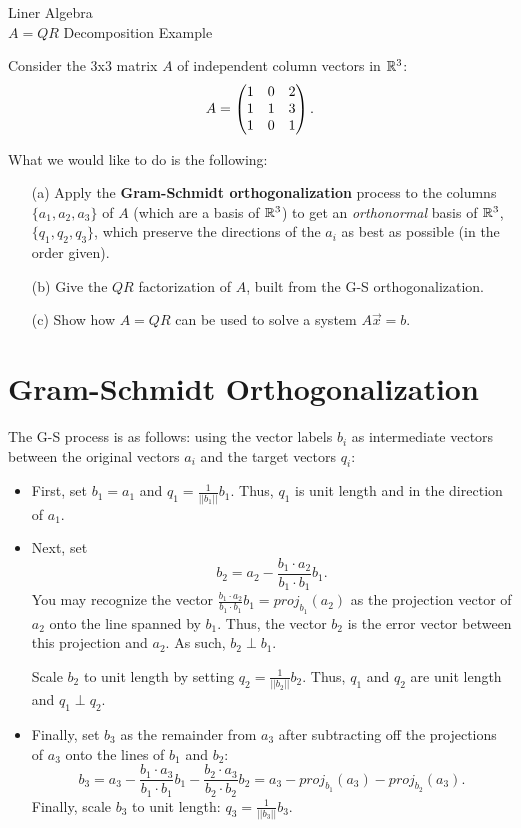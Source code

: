 \documentclass[10pt]{article}
\begin{document}


\begin{center}
Liner Algebra\\
$A = QR$ Decomposition Example
\end{center}


Consider the 3x3 matrix $A$ of independent column vectors in $\mathbb{R}^3$: 
\[ A = \begin{pmatrix} 1 & 0 & 2 \\ 1 & 1 & 3 \\ 1 & 0 & 1 \end{pmatrix}. \]

What we would like to do is the following: 
\begin{itemize}
\item[(a) ] Apply the \textbf{Gram-Schmidt orthogonalization} process to the columns $\{a_1, a_2, a_3\}$ of $A$ (which are a basis of $\mathbb{R}^3$) to get an \emph{orthonormal} basis of $\mathbb{R}^3$, $\{q_1, q_2, q_3\}$, which preserve the directions of the $a_i$ as best as possible (in the order given). 
\item[(b) ] Give the $QR$ factorization of $A$, built from the G-S orthogonalization.
\item[(c) ] Show how $A = QR$ can be used to solve a system $A \vec{x} = b$. 
\end{itemize}

\section{Gram-Schmidt Orthogonalization}

The G-S process is as follows: using the vector labels $b_i$ as intermediate vectors between the original vectors $a_i$ and the target vectors $q_i$: 
\begin{itemize}
\item First, set $b_1 = a_1$ and $q_1 = \frac{1}{||b_1||} b_1$. Thus, $q_1$ is unit length and in the direction of $a_1$. 
\item Next, set 
\[ b_2 = a_2 - \frac{b_1 \cdot a_2}{b_1 \cdot b_1} b_1. \]
You may recognize the vector $\frac{b_1 \cdot a_2}{b_1 \cdot b_1} b_1 = proj_{b_1}(a_2)$ as the projection vector of $a_2$ onto the line spanned by $b_1$. Thus, the vector $b_2$ is the error vector between this projection and $a_2$. As such, $b_2 \perp b_1$.

Scale $b_2$ to unit length by setting $q_2 = \frac{1}{||b_2||} b_2$. Thus, $q_1$ and $q_2$ are unit length and $q_1 \perp q_2$.
\item Finally, set $b_3$ as the remainder from $a_3$ after subtracting off the projections of $a_3$ onto the lines of $b_1$ and $b_2$: 
\[ b_3 = a_3 - \frac{b_1 \cdot a_3}{b_1 \cdot b_1} b_1 - \frac{b_2 \cdot a_3}{b_2 \cdot b_2} b_2 = a_3 - proj_{b_1}(a_3) - proj_{b_2}(a_3). \]
Finally, scale $b_3$ to unit length: $q_3 = \frac{1}{||b_3||} b_3$.
\end{itemize}
\end{document}
